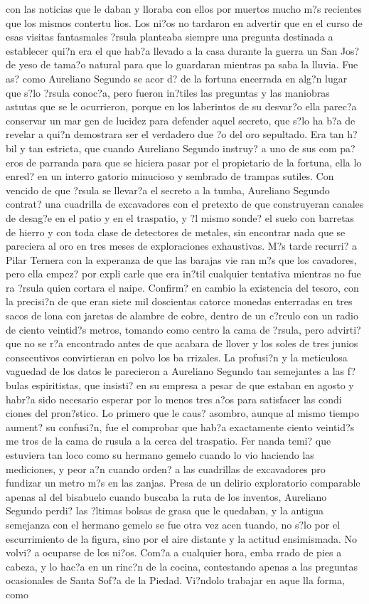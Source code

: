  con las noticias que le daban y lloraba con ellos por muertos mucho m?s recientes que los mismos contertu lios. Los ni?os no tardaron en advertir que en el curso de esas visitas fantasmales ?rsula planteaba siempre una pregunta destinada a establecer qui?n era el que hab?a llevado a la casa durante la guerra un San Jos? de yeso de tama?o natural para que lo guardaran mientras pa saba la lluvia. Fue as? como Aureliano Segundo se acor d? de la fortuna encerrada en alg?n lugar que s?lo ?rsula conoc?a, pero fueron in?tiles las preguntas y las maniobras astutas que se le ocurrieron, porque en los laberintos de su desvar?o ella parec?a conservar un mar gen de lucidez para defender aquel secreto, que s?lo ha b?a de revelar a qui?n demostrara ser el verdadero due ?o del oro sepultado. Era tan h?bil y tan estricta, que cuando Aureliano Segundo instruy? a uno de sus com pa?eros de parranda para que se hiciera pasar por el propietario de la fortuna, ella lo enred? en un interro gatorio minucioso y sembrado de trampas sutiles. Con vencido de que ?rsula se llevar?a el secreto a la tumba, Aureliano Segundo contrat? una cuadrilla de excavadores con el pretexto de que construyeran canales de desag?e en el patio y en el traspatio, y ?l mismo sonde? el suelo con barretas de hierro y con toda clase de detectores de metales, sin encontrar nada que se pareciera al oro en tres meses de exploraciones exhaustivas. M?s tarde recurri? a Pilar Ternera con la experanza de que las barajas vie ran m?s que los cavadores, pero ella empez? por expli carle que era in?til cualquier tentativa mientras no fue ra ?rsula quien cortara el naipe. Confirm? en cambio la existencia del tesoro, con la precisi?n de que eran siete mil doscientas catorce monedas enterradas en tres sacos de lona con jaretas de alambre de cobre, dentro de un c?rculo con un radio de ciento veintid?s metros, tomando como centro la cama de ?rsula, pero advirti? que no se r?a encontrado antes de que acabara de llover y los soles de tres junios consecutivos convirtieran en polvo los ba rrizales. La profusi?n y la meticulosa vaguedad de los datos le parecieron a Aureliano Segundo tan semejantes a las f?bulas espiritistas, que insisti? en su empresa a pesar de que estaban en agosto y habr?a sido necesario esperar por lo menos tres a?os para satisfacer las condi ciones del pron?stico. Lo primero que le caus? asombro, aunque al mismo tiempo aument? su confusi?n, fue el comprobar que hab?a exactamente ciento veintid?s me tros de la cama de rusula a la cerca del traspatio. Fer nanda temi? que estuviera tan loco como su hermano gemelo cuando lo vio haciendo las mediciones, y peor a?n cuando orden? a las cuadrillas de excavadores pro fundizar un metro m?s en las zanjas. Presa de un delirio exploratorio comparable apenas al del bisabuelo cuando buscaba la ruta de los inventos, Aureliano Segundo perdi? las ?ltimas bolsas de grasa que le quedaban, y la antigua semejanza con el hermano gemelo se fue otra vez acen tuando, no s?lo por el escurrimiento de la figura, sino por el aire distante y la actitud ensimismada. No volvi? a ocuparse de los ni?os. Com?a a cualquier hora, emba rrado de pies a cabeza, y lo hac?a en un rinc?n de la cocina, contestando apenas a las preguntas ocasionales de Santa Sof?a de la Piedad. Vi?ndolo trabajar en aque lla forma, como 
